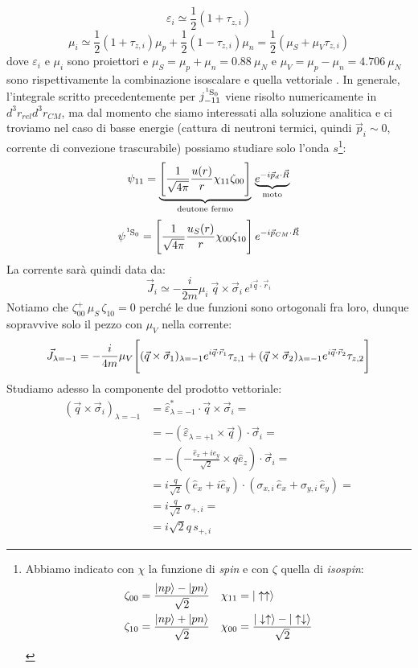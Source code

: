 $$\varepsilon_i \simeq \frac{1}{2}(1+\tau_{z,i})$$
$$\mu_i \simeq \frac{1}{2}(1+\tau_{z,i})\mu_p + \frac{1}{2}(1-\tau_{z,i})\mu_n = \frac{1}{2} (\mu_S +\mu_V \tau_{z,i}) $$
dove $\varepsilon_i$ e $\mu_i$ sono proiettori e $\mu_S = \mu_p + \mu_n = 0.88\: \mu_N $ e $\mu_V = \mu_p - \mu_n = 4.706 \: \mu_N$ sono rispettivamente la combinazione isoscalare e quella vettoriale . In generale, l'integrale scritto precedentemente per $j_{-11}^{\ce{^1S_0}}$ viene risolto numericamente in $d^3r_{rel}d^3r_{CM}$, ma dal momento che siamo interessati alla soluzione analitica e ci troviamo nel caso di basse energie (cattura di neutroni termici, quindi $\vec{p}_i\sim 0$, corrente di convezione trascurabile) possiamo studiare solo l'onda $s$\footnote{Abbiamo indicato con $\chi$ la funzione di \textit{spin} e con $\zeta$ quella di \textit{isospin}:%
\begin{displaymath}
\begin{aligned}
\zeta_{00} &= \frac{|np\rangle-|pn\rangle}{\sqrt{2}} & \chi_{11} &= |\uparrow\uparrow\rangle \\
\zeta_{10} &= \frac{|np\rangle+|pn\rangle}{\sqrt{2}} & \chi_{00} &= \frac{|\downarrow\uparrow\rangle-|\uparrow\downarrow\rangle}{\sqrt{2}} 
\end{aligned}
\end{displaymath}%
}:
$$\psi_{11} = \underbrace{\Biggl [ \frac{1}{\sqrt{4\pi}}\frac{u(r)}{r}\chi_{11}\zeta_{00} \Biggr ]}_\text{deutone fermo}\, \underbrace{e^{-i\vec{p}_d\cdot\vec{R}}}_\text{moto}$$
$$\psi^{\ce{^1S_0}} = \PPq{\frac{1}{\sqrt{4\pi}}\frac{u_S(r)}{r}\chi_{00}\zeta_{10}}\, e^{-i\vec{p}_{CM}\cdot\vec{R}}$$
La corrente sarà quindi data da:
$$\vec{J}_i \simeq -\frac{i}{2m} \mu_i\: \vec{q}\times \vec{\sigma}_i\, e^{i\vec{q}\cdot \vec{r}_i}$$
Notiamo che $\zeta_{00}^+\, \mu_S\, \zeta_{10} = 0$ perché le due funzioni sono ortogonali fra loro, dunque sopravvive solo il pezzo con $\mu_V$ nella corrente:
$$\vec{J}_{\lambda=-1} = -\frac{i}{4m} \mu_V \Biggl [ (\vec{q}\times\vec{\sigma}_1)_{\lambda=-1} e^{i\vec{q}\cdot\vec{r}_1}\tau_{z,1} + (\vec{q}\times\vec{\sigma}_2)_{\lambda=-1} e^{i\vec{q}\cdot\vec{r}_2}\tau_{z,2} \Biggr ] $$
Studiamo adesso la componente del prodotto vettoriale:
\begin{displaymath}
\begin{aligned}
(\vec{q}\times\vec{\sigma}_i)_{\lambda=-1} &= \widehat{\varepsilon}_{\lambda=-1}^* \cdot \vec{q}\times\vec{\sigma}_i =\\
&= -(\widehat{\varepsilon}_{\lambda=+1} \times \vec{q})\cdot\vec{\sigma}_i =\\
&=-(-\frac{\hat{e}_x + i\hat{e}_y}{\sqrt{2}} \times q\hat{e}_z)\cdot\vec{\sigma}_i =\\
&= i \frac{q}{\sqrt{2}} (\hat{e}_x + i\hat{e}_y)\cdot (\sigma_{x,i}\,\hat{e}_x + \sigma_{y,i}\,\hat{e}_y)=\\
&= i \frac{q}{\sqrt{2}}\, \sigma_{+,i} =\\
&= i \sqrt{2} q \, s_{+,i} 
\end{aligned}
\end{displaymath}
